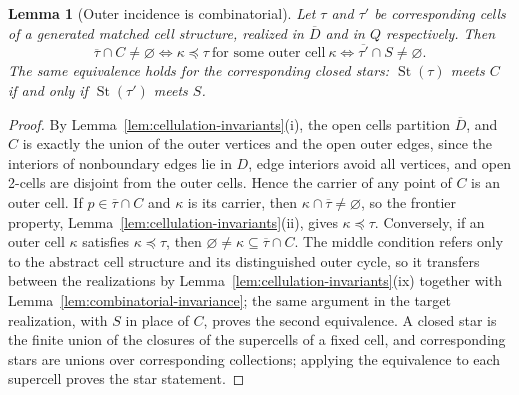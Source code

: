 \documentclass[11pt]{article}
\theoremstyle{mainplain}
\newtheorem{lemma}[theorem]{Lemma}
\theoremstyle{mainroman}
\theoremstyle{definition}
\numberwithin{equation}{section}
\begin{document}
\begin{lemma}[Outer incidence is combinatorial]\label{lem:outer-incidence}
Let \(\tau\) and \(\tau'\) be corresponding cells of a generated
matched cell structure, realized in \(\overline D\) and in \(Q\)
respectively. Then
\[
 \overline\tau\cap C\ne\varnothing
 \iff
 \kappa\preceq\tau\ \text{for some outer cell}\ \kappa
 \iff
 \overline{\tau'}\cap S\ne\varnothing .
\]
The same equivalence holds for the corresponding closed stars:
\(\operatorname{St}(\tau)\) meets \(C\) if and only if
\(\operatorname{St}(\tau')\) meets \(S\).
\end{lemma}
\begin{proof}
By Lemma~\ref{lem:cellulation-invariants}\textup{(i)}, the open cells
partition \(\overline D\), and \(C\) is exactly the union of the outer
vertices and the open outer edges, since the interiors of nonboundary
edges lie in \(D\), edge interiors avoid all vertices, and open
2-cells are disjoint from the outer cells. Hence the carrier of any
point of \(C\) is an outer cell. If \(p\in\overline\tau\cap C\) and
\(\kappa\) is its carrier, then \(\kappa\cap\overline\tau\ne\varnothing\),
so the frontier property,
Lemma~\ref{lem:cellulation-invariants}\textup{(ii)}, gives
\(\kappa\preceq\tau\). Conversely, if an outer cell \(\kappa\)
satisfies \(\kappa\preceq\tau\), then
\(\varnothing\ne\kappa\subseteq\overline\tau\cap C\). The middle
condition refers only to the abstract cell structure and its
distinguished outer cycle, so it transfers between the realizations by
Lemma~\ref{lem:cellulation-invariants}\textup{(ix)} together with
Lemma~\ref{lem:combinatorial-invariance}; the same argument in the
target realization, with \(S\) in place of \(C\), proves the second
equivalence. A closed star is the finite union of the closures of the
supercells of a fixed cell, and corresponding stars are unions over
corresponding collections; applying the equivalence to each supercell
proves the star statement.
\end{proof}
\end{document}
